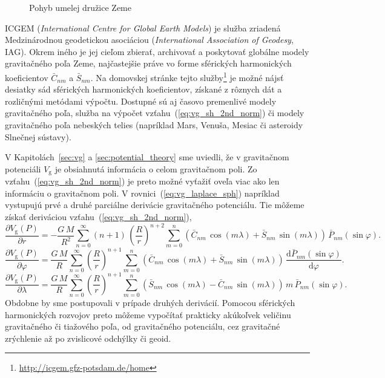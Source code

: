 \documentclass[a4paper, 12pt]{book}
\newcommand{\diff}{\mathrm d}
\newcommand{\gidx}{\mathrm g}
\begin{document}
\begin{figure}
\centering

\caption{Pohyb umelej družice Zeme}
\label{fig:orbital_motion_real}
\end{figure}

ICGEM (\emph{International Centre for Global Earth Models}) je služba zriadená 
Medzinárodnou geodetickou asociáciou (\emph{International Association of 
Geodesy}, IAG).  Okrem iného je jej cieľom zbierať, archivovať a poskytovať 
globálne modely gravitačného poľa Zeme, najčastejšie práve vo forme sférických 
harmonických koeficientov $\bar{C}_{nm}$ a $\bar{S}_{nm}$.  Na domovskej 
stránke tejto služby\footnote{\url{http://icgem.gfz-potsdam.de/home}} je možné 
nájsť desiatky sád sférických harmonických koeficientov, získané z rôznych dát 
a rozličnými metódami výpočtu.  Dostupné sú aj časovo premenlivé modely 
gravitačného poľa, služba na výpočet vzťahu~(\ref{eq:vg_sh_2nd_norm}) či modely 
gravitačného poľa nebeských telies (napríklad Mars, Venuša, Mesiac či asteroidy 
Slnečnej sústavy).

V Kapitolách~\ref{sec:vg} a \ref{sec:potential_theory} sme uviedli, že 
v gravitačnom potenciáli $V_\gidx$ je obsiahnutá informácia o celom gravitačnom 
poli.  Zo vzťahu~(\ref{eq:vg_sh_2nd_norm}) je preto možné vyťažiť oveľa viac 
ako len informáciu o gravitačnom poli.  V rovnici~(\ref{eq:vg_laplace_sph}) 
napríklad vystupujú prvé a druhé parciálne derivácie gravitačného potenciálu.  
Tie môžeme získať deriváciou vzťahu~(\ref{eq:vg_sh_2nd_norm}),
%
\begin{equation}
\label{eq:vgr_sh_2nd_norm}
\frac{\partial V_\gidx(P)}{\partial r} = - \frac{G \, M}{R^2} \sum_{n 
= 0}^\infty (n + 1) \, \left( \frac{R}{r} \right)^{n + 2} \sum_{m = 0}^{n} 
\left( \bar{C}_{nm} \, \cos(m\lambda) + \bar{S}_{nm} \, \sin(m\lambda)\right) 
\, \bar{P}_{nm}(\sin\varphi){.}
\end{equation}
%
\begin{equation}
\label{eq:vglat_sh_2nd_norm}
\frac{\partial V_\gidx(P)}{\partial \varphi} = \frac{G \, M}{R} \sum_{n 
= 0}^\infty \left( \frac{R}{r} \right)^{n + 1} \sum_{m = 0}^{n} \left( 
\bar{C}_{nm} \, \cos(m\lambda) + \bar{S}_{nm} \, \sin(m\lambda)\right) \, 
\frac{\diff \bar{P}_{nm}(\sin\varphi)}{\diff \varphi}{.}
\end{equation}
%
\begin{equation}
\label{eq:vglon_sh_2nd_norm}
\frac{\partial V_\gidx(P)}{\partial \lambda} = \frac{G \, M}{R} \sum_{n 
= 0}^\infty \left( \frac{R}{r} \right)^{n + 1} \sum_{m = 0}^{n}\left( 
\bar{S}_{nm} \, \cos(m\lambda) - \bar{C}_{nm} \, \sin(m\lambda)\right) \, m \, 
\bar{P}_{nm}(\sin\varphi){.}
\end{equation}
%
Obdobne by sme postupovali v prípade druhých derivácií.  Pomocou sférických 
harmonických rozvojov preto môžeme vypočítať prakticky akúkoľvek veličinu 
gravitačného či tiažového poľa, od gravitačného potenciálu, cez gravitačné 
zrýchlenie až po zvislicové odchýlky či geoid.
\end{document}
